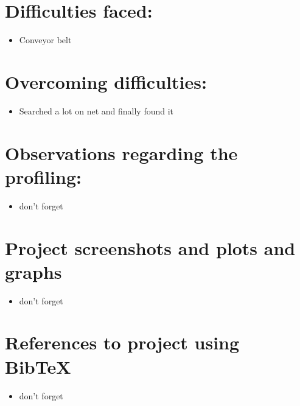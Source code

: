 \documentclass[10pt,a4paper]{article}
\begin{document}
\section*{\textbf{Difficulties faced:}}
\begin{itemize}[itemsep = -0.75 mm, leftmargin=*]
 \item Conveyor belt
\end{itemize}

\vspace{-10pt}

\section*{\textbf{Overcoming difficulties:}}
 \begin{itemize}[itemsep = -0.75 mm, leftmargin=*]
  \item Searched a lot on net and finally found it
 \end{itemize}
 \vspace{-10pt}

 
\section*{\textbf{Observations regarding the profiling:}}
 \begin{itemize}[itemsep = -0.75 mm, leftmargin=*]
  \item don't forget
 \end{itemize}
 \vspace{-10pt}


\section*{\textbf{Project screenshots and plots and graphs}}
 \begin{itemize}[itemsep = -0.75 mm, leftmargin=*]
  \item don't forget
 \end{itemize}
\vspace{-10pt}

\section*{\textbf{References to project using BibTeX}}
 \begin{itemize}[itemsep = -0.75 mm, leftmargin=*]
  \item don't forget
 \end{itemize}
\end{document}
